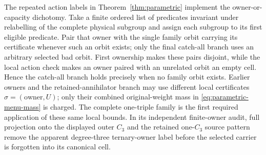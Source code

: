 The repeated action labels in Theorem~\ref{thm:parametric} implement the
owner-or-capacity dichotomy.  Take a finite ordered list of predicates
invariant under relabelling of the complete physical subgroup and assign each
subgroup to its first eligible predicate.  Pair that owner with the single
family orbit carrying its certificate whenever such an orbit exists; only
the final catch-all branch uses an arbitrary selected bad orbit.  First
ownership makes these pairs disjoint, while the local action check makes an
owner paired with an unrelated orbit an empty cell.  Hence the catch-all
branch holds precisely when no family orbit exists.  Earlier owners and the
retained-annihilator branch may use different local certificates
$\sigma=(\text{owner},U)$; only their combined original-weight mass in
\eqref{eq:parametric-menu-mass} is charged.  The
complete one-triple family is the first required application of these same
local bounds.  In its independent finite-owner audit, full projection onto
the displayed outer $C_3$ and the retained one-$C_3$ source pattern remove the
apparent degree-three ternary-owner label before the selected carrier is
forgotten into its canonical cell.

